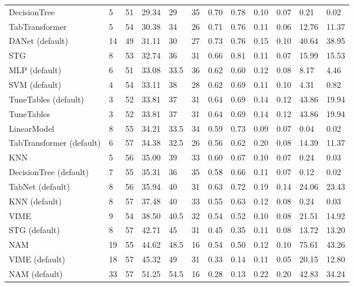 \begin{tabular}{lllllrllllll}
DecisionTree & 5 & 51 & 29.34 & 29 & 35 & 0.70 & 0.78 & 0.10 & 0.07 & 0.21 & 0.02 \\
TabTransformer & 5 & 54 & 30.38 & 34 & 26 & 0.71 & 0.76 & 0.11 & 0.06 & 12.76 & 11.37 \\
DANet (default) & 14 & 49 & 31.11 & 30 & 27 & 0.73 & 0.76 & 0.15 & 0.10 & 40.64 & 38.95 \\
STG & 8 & 53 & 32.74 & 36 & 31 & 0.66 & 0.81 & 0.11 & 0.07 & 15.99 & 15.53 \\
MLP (default) & 6 & 51 & 33.08 & 33.5 & 36 & 0.62 & 0.60 & 0.12 & 0.08 & 8.17 & 4.46 \\
SVM (default) & 4 & 54 & 33.11 & 38 & 28 & 0.62 & 0.69 & 0.11 & 0.10 & 4.31 & 0.82 \\
TuneTables (default) & 3 & 52 & 33.81 & 37 & 31 & 0.64 & 0.69 & 0.14 & 0.12 & 43.86 & 19.94 \\
TuneTables & 3 & 52 & 33.81 & 37 & 31 & 0.64 & 0.69 & 0.14 & 0.12 & 43.86 & 19.94 \\
LinearModel & 8 & 55 & 34.21 & 33.5 & 34 & 0.59 & 0.73 & 0.09 & 0.07 & 0.04 & 0.02 \\
TabTransformer (default) & 6 & 57 & 34.38 & 32.5 & 26 & 0.56 & 0.62 & 0.20 & 0.08 & 14.39 & 11.37 \\
KNN & 5 & 56 & 35.00 & 39 & 33 & 0.60 & 0.67 & 0.10 & 0.07 & 0.24 & 0.03 \\
DecisionTree (default) & 7 & 55 & 35.31 & 36 & 35 & 0.58 & 0.66 & 0.11 & 0.07 & 0.12 & 0.02 \\
TabNet (default) & 8 & 56 & 35.94 & 40 & 31 & 0.63 & 0.72 & 0.19 & 0.14 & 24.06 & 23.43 \\
KNN (default) & 8 & 57 & 37.48 & 40 & 33 & 0.55 & 0.63 & 0.12 & 0.08 & 0.24 & 0.03 \\
VIME & 9 & 54 & 38.50 & 40.5 & 32 & 0.54 & 0.52 & 0.10 & 0.08 & 21.51 & 14.92 \\
STG (default) & 8 & 57 & 42.71 & 45 & 31 & 0.45 & 0.35 & 0.11 & 0.08 & 13.72 & 13.20 \\
NAM & 19 & 55 & 44.62 & 48.5 & 16 & 0.54 & 0.50 & 0.12 & 0.10 & 75.61 & 43.26 \\
VIME (default) & 18 & 57 & 45.32 & 49 & 31 & 0.33 & 0.14 & 0.11 & 0.05 & 20.15 & 12.80 \\
NAM (default) & 33 & 57 & 51.25 & 54.5 & 16 & 0.28 & 0.13 & 0.22 & 0.20 & 42.83 & 34.24 \\
\bottomrule
\end{tabular}
